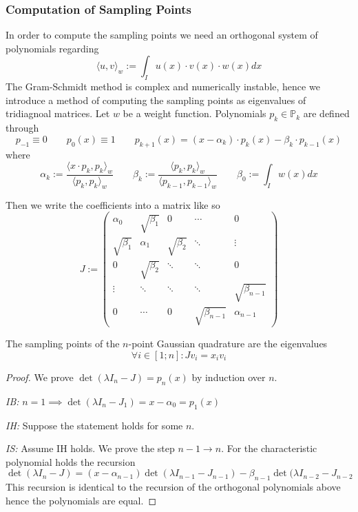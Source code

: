 \subsubsection{Computation of Sampling Points}
In order to compute the sampling points we need an orthogonal system of polynomials regarding
\[\langle u, v \rangle_w := \int_I u(x) \cdot v(x) \cdot w(x) dx\]
The Gram-Schmidt method is complex and numerically instable, hence we introduce a method of computing the sampling points as eigenvalues of tridiagnoal matrices.
Let \(w\) be a weight function.
Polynomials \(p_k \in \mathbb{P}_k\) are defined through
\[p_{-1} \equiv 0 \qquad p_0(x) \equiv 1 \qquad p_{k+1}(x) = (x - \alpha_k)\cdot p_k(x) - \beta_k \cdot p_{k-1}(x)\]
where
\[\alpha_k := \frac{\langle x \cdot p_k, p_k\rangle_w}{\langle p_k, p_k \rangle_w} \qquad \beta_k := \frac{\langle p_k, p_k\rangle_w}{\langle p_{k-1}, p_{k-1}\rangle_w} \qquad \beta_0 := \int_I w(x) dx\]

Then we write the coefficients into a matrix like so
\[J := \begin{pmatrix}
      \alpha_0       & \sqrt{\beta_1} & 0              & \cdots             & 0                  \\
      \sqrt{\beta_1} & \alpha_1       & \sqrt{\beta_2} & \ddots             & \vdots             \\
      0              & \sqrt{\beta_2} & \ddots         & \ddots             & 0                  \\
      \vdots         & \ddots         & \ddots         & \ddots             & \sqrt{\beta_{n-1}} \\
      0              & \cdots         & 0              & \sqrt{\beta_{n-1}} & \alpha_{n-1}
\end{pmatrix}\]

\begin{theorem}
   The sampling points of the \(n\)-point Gaussian quadrature are the eigenvalues
   \[\forall i \in [1;n]: J v_i = x_i v_i\]
\end{theorem}
\begin{proof}
   We prove \(\det(\lambda I_n - J) = p_n(x)\) by induction over \(n\).

   \emph{IB:} \(n = 1 \implies \det(\lambda I_n - J_1) = x - \alpha_0 = p_1(x)\)

   \emph{IH:} Suppose the statement holds for some \(n\).

   \emph{IS:} Assume IH holds.
   We prove the step \(n-1 \to n\).
   For the characteristic polynomial holds the recursion
   \[\det(\lambda I_n - J) = (x - \alpha_{n-1})\det(\lambda I_{n-1} - J_{n-1}) - \beta_{n-1}\det(\lambda I_{n-2} - J_{n-2}\]
   This recursion is identical to the recursion of the orthogonal polynomials above hence the polynomials are equal.
\end{proof}

